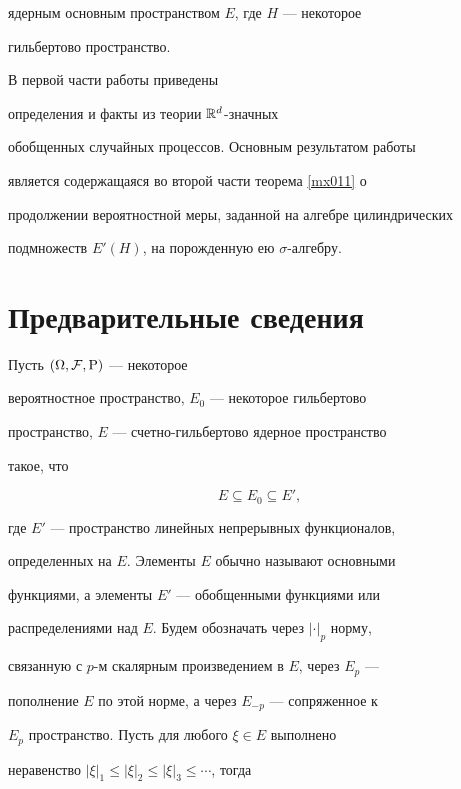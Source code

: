 ядерным основным пространством $E$, где $H$ --- некоторое


гильбертово пространство.





В первой части работы приведены 


определения и факты из теории $\Bbb{R}^d$-значных


обобщенных случайных процессов. Основным результатом работы


является содержащаяся во второй части теорема \ref{mx011} о


продолжении вероятностной меры, заданной на алгебре цилиндрических


подмножеств $E'(H)$, на порожденную ею $\sigma$-алгебру.








\section{Предварительные сведения}





Пусть $ (\Omega, {\cal F}, \mathrm{P})$ --- некоторое


вероятностное пространство, $E_0$ --- некоторое гильбертово


пространство, $E$ --- счетно-гильбертово ядерное пространство


такое, что


$$


E\subseteq E_0\subseteq E',


$$


где $E'$ --- пространство линейных непрерывных функционалов,


определенных на $E$. Элементы $E$ обычно называют основными


функциями, а элементы $E'$ --- обобщенными функциями или


распределениями над $E$. Будем обозначать через $|\cdot|_p$ норму,


связанную с $p$-м скалярным произведением в $E$, через $E_p$ ---


пополнение $E$ по этой норме, а через $E_{-p}$ --- сопряженное к


$E_p$ пространство. Пусть для любого $\xi\in E$ выполнено


неравенство $|\xi|_1\leq |\xi|_2\leq |\xi|_3\leq\dotsb$, тогда


